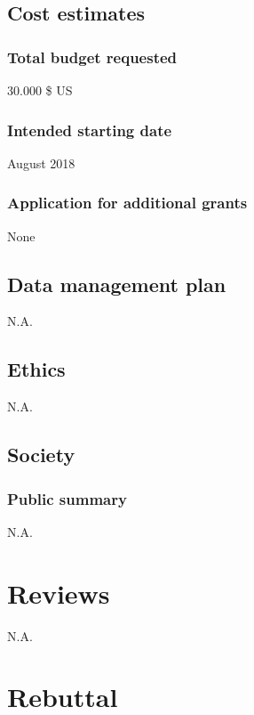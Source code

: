 \documentclass[twocolumn, issue, rga, authordate]{jote-new-article}
\begin{document}
\subsection{Cost estimates}



\subsubsection{Total budget requested}


30.000 \$ US


\subsubsection{Intended starting date}


August 2018


\subsubsection{Application for additional grants}


None


\subsection{Data management plan}


N.A.


\subsection{Ethics}


N.A.


\subsection{Society}



\subsubsection{Public summary}


N.A.


\section{Reviews}


N.A.


\section{Rebuttal}
\end{document}
